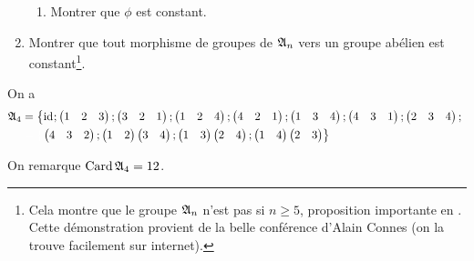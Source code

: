 \begin{exo}
\begin{enumerate}[resume=exoAn]
\begin{enumerate}
\item Montrer que \(\phi\) est constant. \\
\end{enumerate}

\item Montrer que tout morphisme de groupes de \(\frak{A}_{n}\) vers un groupe abélien est constant\footnote{Cela montre que le groupe \(\frak{A}_{n}\) n'est pas  si \(n\geq5\), proposition importante en . Cette démonstration provient de la belle conférence d'Alain Connes  (on la trouve facilement sur internet).}.
\end{enumerate}
\end{exo}

\begin{corr}[1]
On a \[\begin{aligned}
\frakA{4}&=\left\lbrace\id{};\begin{pmatrix}1 & 2 & 3\end{pmatrix};\begin{pmatrix}3 & 2 & 1\end{pmatrix};\begin{pmatrix}1 & 2 & 4\end{pmatrix};\begin{pmatrix}4 & 2 & 1\end{pmatrix};\begin{pmatrix}1 & 3 & 4\end{pmatrix};\begin{pmatrix}4 & 3 & 1\end{pmatrix};\begin{pmatrix}2 & 3 & 4\end{pmatrix};\right. \\
&\color{white}=\lbrace\color{black}\left.\begin{pmatrix}4 & 3 & 2\end{pmatrix};\begin{pmatrix}1 & 2\end{pmatrix}\begin{pmatrix}3 & 4\end{pmatrix};\begin{pmatrix}1 & 3\end{pmatrix}\begin{pmatrix}2 & 4\end{pmatrix};\begin{pmatrix}1 & 4\end{pmatrix}\begin{pmatrix}2 & 3\end{pmatrix}\right\rbrace
\end{aligned}\]

On remarque \(\operatorname{Card}\frak{A}_{4}=12\).
\end{corr}


